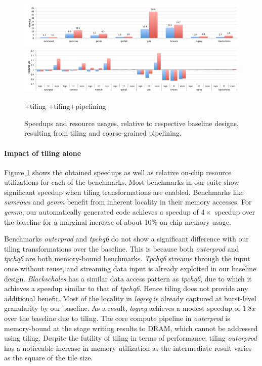 \begin{figure}
\centering
\includegraphics[width=\textwidth]{3-delite/figs/newspeedupbars1.pdf}
\vspace{10pt}
\includegraphics[width=\textwidth]{3-delite/figs/newspeedupbars2.pdf}

{
\selectfont
\footnotesize
{}
+tiling
\hspace{2em}
+tiling+pipelining
}

\caption{Speedups and resource usages, relative to respective baseline designs, resulting from tiling and coarse-grained pipelining.}
\label{fig:speedup-bars}
\end{figure}

\paragraph{Impact of tiling alone}
Figure \ref{fig:speedup-bars} shows the obtained speedups as well as relative on-chip resource utilizations for each of the benchmarks.
Most benchmarks in our suite show significant speedup when tiling
transformations are enabled. Benchmarks like \emph{sumrows} and \emph{gemm}
benefit from inherent locality in their memory accesses. For \emph{gemm}, our automatically generated code
achieves a speedup of $4\times$ speedup over the baseline for a marginal increase of about $10\%$ on-chip memory usage.

Benchmarks \emph{outerprod} and \emph{tpchq6} do not
show a significant difference with our tiling transformations over the baseline.
This is because both \emph{outerprod} and
\emph{tpchq6} are both memory-bound benchmarks. \emph{Tpchq6} streams through the input once without reuse, and streaming
data input is already exploited in our baseline design. \emph{Blackscholes} has a similar data access pattern as \emph{tpchq6},
due to which it achieves a speedup similar to that of \emph{tpchq6}. Hence tiling does not provide any additional benefit.
Most of the locality in \emph{logreg} is already captured at burst-level granularity by our baseline. As a result, \emph{logreg}
achieves a modest speedup of $1.8x$ over the baseline due to tiling.
The core compute pipeline in \emph{outerprod} is memory-bound at the stage writing results to DRAM, which cannot be addressed
using tiling. Despite the futility of tiling in terms of performance, tiling \emph{outerprod}
has a noticeable increase in memory utilization as the intermediate result varies as the square of the tile size.

